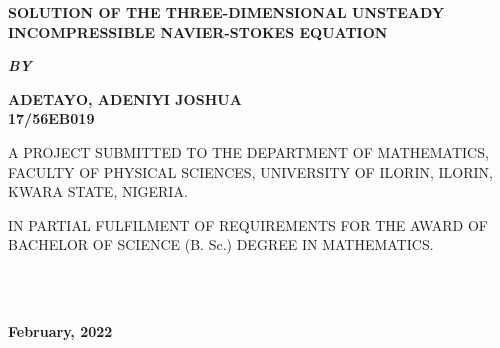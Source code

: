 \documentclass[11pt]{report}
\newcommand{\bt}[1]{\textbf{#1}}
\begin{document}
	
	\clearpage
	\thispagestyle{empty}
	\begin{center}
		\Large \bt{SOLUTION OF THE THREE-DIMENSIONAL UNSTEADY INCOMPRESSIBLE NAVIER-STOKES EQUATION}
	\end{center}

	\hspace{7cm}
	
	\begin{center}
		\textbf{\textit{BY}}
	\end{center}
	
	\hspace{5cm}
	
	\begin{center}
		\large \textbf{ADETAYO, ADENIYI JOSHUA
			\\
			17/56EB019}
	\end{center}
	
	\hspace{9cm}
	
	\begin{center}
		A PROJECT SUBMITTED TO THE DEPARTMENT OF MATHEMATICS, FACULTY OF PHYSICAL SCIENCES, UNIVERSITY OF ILORIN, ILORIN, KWARA STATE, NIGERIA.
	\end{center}

	\hspace{7cm}
	
	\begin{center}
		IN PARTIAL FULFILMENT OF REQUIREMENTS FOR THE AWARD OF BACHELOR OF SCIENCE (B. Sc.) DEGREE IN MATHEMATICS.
	\end{center}
	\hspace{5cm}
	\\ \\ 
	\begin{center}
		\textbf{February, 2022}
	\end{center}

	\newpage
\end{document}
